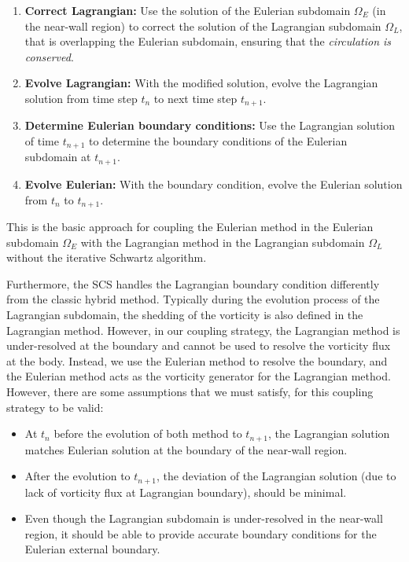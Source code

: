 		\begin{enumerate}
		\item \textbf{Correct Lagrangian:} Use the solution of the Eulerian subdomain $\Omega_E$ (in the near-wall region) to correct the solution of the Lagrangian subdomain $\Omega_L$, that is overlapping the Eulerian subdomain, ensuring that the \textit{circulation is conserved}.  
		
		\item \textbf{Evolve Lagrangian:} With the modified solution, evolve the Lagrangian solution from time step $t_n$ to next time step $t_{n+1}$.
		
		\item \textbf{Determine Eulerian boundary conditions:} Use the Lagrangian solution of time $t_{n+1}$ to determine the boundary conditions of the Eulerian subdomain at $t_{n+1}$.
		
		\item \textbf{Evolve Eulerian:} With the boundary condition, evolve the Eulerian solution from $t_n$ to $t_{n+1}$.
		\end{enumerate}
	
	This is the basic approach for coupling the Eulerian method in the Eulerian subdomain $\Omega_E$ with the Lagrangian method in the Lagrangian subdomain $\Omega_L$ without the iterative Schwartz algorithm. 
	
	Furthermore, the SCS handles the Lagrangian boundary condition differently from the classic hybrid method. Typically during the evolution process of the Lagrangian subdomain, the shedding of the vorticity is also defined in the Lagrangian method. However, in our coupling strategy, the Lagrangian method is under-resolved at the boundary and cannot be used to resolve the vorticity flux at the body. Instead, we use the Eulerian method to resolve the boundary, and the Eulerian method acts as the vorticity generator for the Lagrangian method. However, there are some assumptions that we must satisfy, for this coupling strategy to be valid:

	\begin{itemize}
	\item At $t_n$ before the evolution of both method to $t_{n+1}$, the Lagrangian solution matches Eulerian solution at the boundary of the near-wall region.
	\item After the evolution to $t_{n+1}$, the deviation of the Lagrangian solution (due to lack of vorticity flux at Lagrangian boundary), should be minimal.
	\item Even though the Lagrangian subdomain is under-resolved in the near-wall region, it should be able to provide accurate boundary conditions for the Eulerian external boundary.
	\end{itemize}
	

